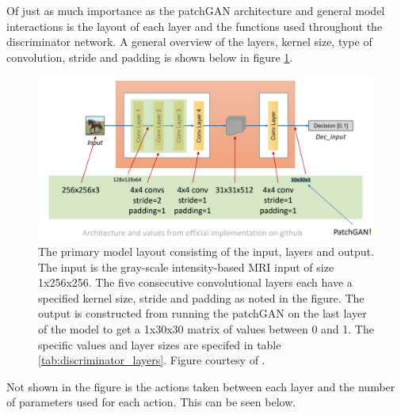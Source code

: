 \documentclass[11pt, fleqn, titlepage]{article}
\newcommand{\1}[1]{\mathds{1}\left[#1\right]}
\begin{document}
Of just as much importance as the patchGAN architecture and general model interactions is the layout of each layer and the functions used throughout the discriminator network. A general overview of the layers, kernel size, type of convolution, stride and padding is shown below in figure \ref{fig:cyclegandiscriminatorlayers}.
\begin{figure}[H]
	\centering
	\includegraphics[width=0.7\linewidth]{imgs/cyclegan_discriminator_layers}
	\caption{The primary model layout consisting of the input, layers and output. The input is the gray-scale intensity-based MRI input of size 1x256x256. The five consecutive convolutional layers each have a specified kernel size, stride and padding as noted in the figure. The output is constructed from running the patchGAN on the last layer of the model to get a 1x30x30 matrix of values between 0 and 1. The specific values and layer sizes are specifed in table \ref{tab:discriminator_layers}. Figure courtesy of \cite{cyclegan_figures}.}
	\label{fig:cyclegandiscriminatorlayers}
\end{figure}

Not shown in the figure is the actions taken between each layer and the number of parameters used for each action. This can be seen below. 
\end{document}
